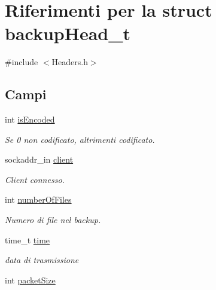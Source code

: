 \hypertarget{structbackupHead__t}{}\section{Riferimenti per la struct backup\+Head\+\_\+t}
\label{structbackupHead__t}


{\ttfamily \#include $<$Headers.\+h$>$}

\subsection*{Campi}
\begin{DoxyCompactItemize}
\item 
int \hyperlink{structbackupHead__t_a64a2bbf3ac2b55559174370602f9789e}{is\+Encoded}\hypertarget{structbackupHead__t_a64a2bbf3ac2b55559174370602f9789e}{}\label{structbackupHead__t_a64a2bbf3ac2b55559174370602f9789e}

\begin{DoxyCompactList}\small\item\em Se 0 non codificato, altrimenti codificato. \end{DoxyCompactList}\item 
sockaddr\+\_\+in \hyperlink{structbackupHead__t_a0f48957bfa9356cfd9b87dbcc55f7899}{client}\hypertarget{structbackupHead__t_a0f48957bfa9356cfd9b87dbcc55f7899}{}\label{structbackupHead__t_a0f48957bfa9356cfd9b87dbcc55f7899}

\begin{DoxyCompactList}\small\item\em Client connesso. \end{DoxyCompactList}\item 
int \hyperlink{structbackupHead__t_a28e29f98f2a4ffe65a22d94ca8d8be1a}{number\+Of\+Files}\hypertarget{structbackupHead__t_a28e29f98f2a4ffe65a22d94ca8d8be1a}{}\label{structbackupHead__t_a28e29f98f2a4ffe65a22d94ca8d8be1a}

\begin{DoxyCompactList}\small\item\em Numero di file nel backup. \end{DoxyCompactList}\item 
time\+\_\+t \hyperlink{structbackupHead__t_ab68d978e581788f551a7c1e740bba05b}{time}\hypertarget{structbackupHead__t_ab68d978e581788f551a7c1e740bba05b}{}\label{structbackupHead__t_ab68d978e581788f551a7c1e740bba05b}

\begin{DoxyCompactList}\small\item\em data di trasmissione \end{DoxyCompactList}\item 
int \hyperlink{structbackupHead__t_a82c0b9e0bf9012b907162fb278d3b689}{packet\+Size}\hypertarget{structbackupHead__t_a82c0b9e0bf9012b907162fb278d3b689}{}\label{structbackupHead__t_a82c0b9e0bf9012b907162fb278d3b689}


\end{DoxyCompactItemize}
